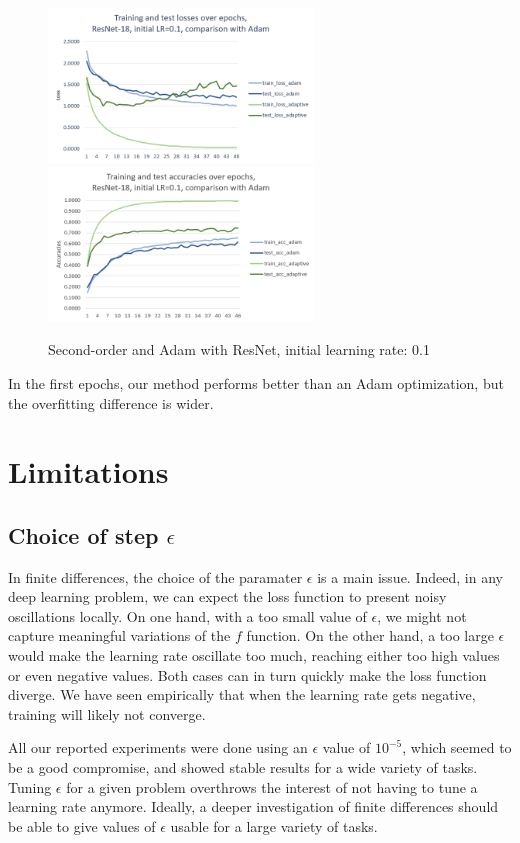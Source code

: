 \documentclass{article}
\begin{document}
  \begin{figure}[!h]
  	\includegraphics[width=200pt]{loss_resnet_adam_0_1.png}
  	\includegraphics[width=200pt]{acc_resnet_adam_0_1.png}
  	\caption{Second-order and Adam with ResNet, initial learning rate: 0.1}
  \end{figure}

  In the first epochs, our method performs better than an Adam optimization, but the overfitting difference is wider. 

  
  \section{Limitations}
  
  \subsection{Choice of step $\epsilon$}
  
  In finite differences, the choice of the paramater $\epsilon$ is a main issue. Indeed, in any deep learning problem, we can expect the loss function to present noisy oscillations locally. On one hand, with a too small value of $\epsilon$, we might not capture meaningful variations of the $f$ function. On the other hand, a too large $\epsilon$ would make the learning rate oscillate too much, reaching either too high values or even negative values. Both cases can in turn quickly make the loss function diverge. We have seen empirically that when the learning rate gets negative, training will likely not converge. 
  
  All our reported experiments were done using an $\epsilon$ value of $10^{-5}$, which seemed to be a good compromise, and showed stable results for a wide variety of tasks. Tuning $\epsilon$ for a given problem overthrows the interest of not having to tune a learning rate anymore. Ideally, a deeper investigation of finite differences should be able to give values of $\epsilon$ usable for a large variety of tasks. 
  
\end{document}

